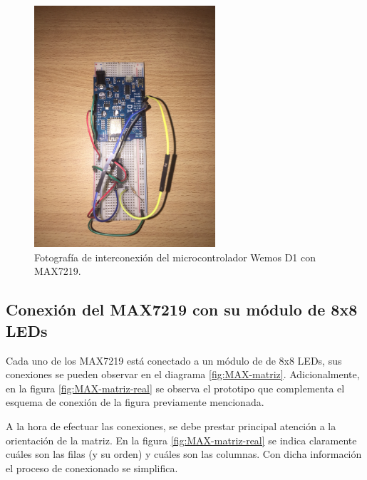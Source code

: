     \begin{figure}[ht!]
        \centering
        \begin{center}
            \includegraphics[width=0.6\textwidth]{imagenes/hw-conexiones/conexion-Wemos-MAX.JPG}
            \caption{Fotografía de interconexión del microcontrolador Wemos D1 con MAX7219.}
            \label{fig:Wemos-MAX-real}
        \end{center}
    \end{figure}


    \subsection{Conexión del MAX7219 con su módulo de 8x8 LEDs}
    Cada uno de los MAX7219 está conectado a un módulo de de 8x8 LEDs, sus conexiones se pueden observar en el diagrama \ref{fig:MAX-matriz}. Adicionalmente, en la figura \ref{fig:MAX-matriz-real} se observa el prototipo que complementa el esquema de conexión de la figura previamente mencionada. 
    
    A la hora de efectuar las conexiones, se debe prestar principal atención a la orientación de la matriz. En la figura \ref{fig:MAX-matriz-real} se indica claramente cuáles son las filas (y su orden) y cuáles son las columnas. Con dicha información el proceso de conexionado se simplifica.


